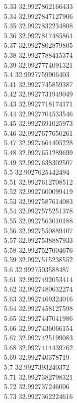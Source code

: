 {5.33	32.9927862166433\\
5.34	32.9927847127906\\
5.35	32.9927832234808\\
5.36	32.9927817485864\\
5.37	32.9927802879805\\
5.38	32.9927788415374\\
5.39	32.9927774091321\\
5.4	32.9927759906403\\
5.41	32.9927745859387\\
5.42	32.9927731949049\\
5.43	32.9927718174171\\
5.44	32.9927704533546\\
5.45	32.9927691025973\\
5.46	32.9927677650261\\
5.47	32.9927664405228\\
5.48	32.9927651289699\\
5.49	32.9927638302507\\
5.5	32.9927625442494\\
5.51	32.9927612708512\\
5.52	32.9927600099419\\
5.53	32.9927587614083\\
5.54	32.9927575251378\\
5.55	32.9927563010188\\
5.56	32.9927550889407\\
5.57	32.9927538887933\\
5.58	32.9927527004676\\
5.59	32.9927515238552\\
5.6	32.9927503588487\\
5.61	32.9927492053414\\
5.62	32.9927480632274\\
5.63	32.9927469324016\\
5.64	32.9927458127598\\
5.65	32.9927447041986\\
5.66	32.9927436066154\\
5.67	32.9927425199083\\
5.68	32.9927414439762\\
5.69	32.992740378719\\
5.7	32.9927393240372\\
5.71	32.9927382798321\\
5.72	32.992737246006\\
5.73	32.9927362224616\\
}
